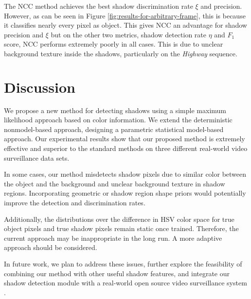 The NCC method achieves the best shadow discrimination rate $\xi$ and
precision. However, as can be seen in
Figure \ref{fig:results-for-arbitrary-frame}, this is because it
classifies nearly every pixel as object.  This gives NCC an advantage
for shadow precision and $\xi$ but on the other two metrics, shadow
detection rate $\eta$ and $F_1$ score, NCC performs extremely poorly
in all cases.  This is due to unclear background texture inside the
shadows, particularly on the \textit{Highway} sequence.

\section{Discussion}
\label{sec:shadow-discussion}

We propose a new method for detecting shadows using a simple maximum
likelihood approach based on color information.  We extend the
deterministic nonmodel-based approach, designing a parametric
statistical model-based approach. Our experimental results show that
our proposed method is extremely effective and superior to the
standard methods on three different real-world video surveillance data
sets.

In some cases, our method misdetects shadow pixels due to similar
color between the object and the background and unclear background
texture in shadow regions. Incorporating geometric or shadow region
shape priors would potentially improve the detection and
discrimination rates. 

Additionally, the distributions over the difference 
in HSV color space for true object pixels and true shadow pixels remain 
static once trained. Therefore, the current approach may be inappropriate 
in the long run. A more adaptive approach should be considered.

In future work, we plan to address these issues, further explore the
feasibility of combining our method with other useful shadow features,
and integrate our shadow detection module with a real-world open
source video surveillance system .

\FloatBarrier



